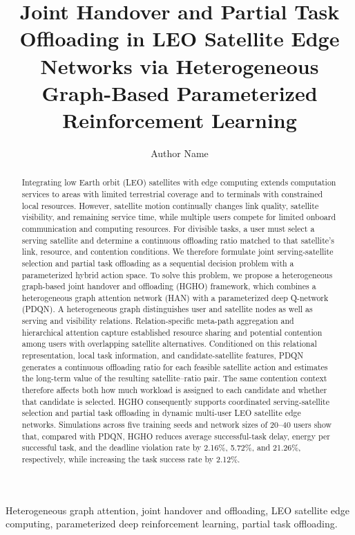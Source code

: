 \documentclass[journal]{IEEEtran}
\title{Joint Handover and Partial Task Offloading in LEO Satellite Edge Networks via Heterogeneous Graph-Based Parameterized Reinforcement Learning}
\author{Author Name}
\begin{document}
\maketitle

\begin{abstract}
Integrating low Earth orbit (LEO) satellites with edge computing extends computation services to areas with limited terrestrial coverage and to terminals with constrained local resources. However, satellite motion continually changes link quality, satellite visibility, and remaining service time, while multiple users compete for limited onboard communication and computing resources. For divisible tasks, a user must select a serving satellite and determine a continuous offloading ratio matched to that satellite's link, resource, and contention conditions. We therefore formulate joint serving-satellite selection and partial task offloading as a sequential decision problem with a parameterized hybrid action space. To solve this problem, we propose a heterogeneous graph-based joint handover and offloading (HGHO) framework, which combines a heterogeneous graph attention network (HAN) with a parameterized deep Q-network (PDQN). A heterogeneous graph distinguishes user and satellite nodes as well as serving and visibility relations. Relation-specific meta-path aggregation and hierarchical attention capture established resource sharing and potential contention among users with overlapping satellite alternatives. Conditioned on this relational representation, local task information, and candidate-satellite features, PDQN generates a continuous offloading ratio for each feasible satellite action and estimates the long-term value of the resulting satellite--ratio pair. The same contention context therefore affects both how much workload is assigned to each candidate and whether that candidate is selected. HGHO consequently supports coordinated serving-satellite selection and partial task offloading in dynamic multi-user LEO satellite edge networks. Simulations across five training seeds and network sizes of 20--40 users show that, compared with PDQN, HGHO reduces average successful-task delay, energy per successful task, and the deadline violation rate by 2.16\%, 5.72\%, and 21.26\%, respectively, while increasing the task success rate by 2.12\%.
\end{abstract}

\begin{IEEEkeywords}
Heterogeneous graph attention, joint handover and offloading, LEO satellite edge computing, parameterized deep reinforcement learning, partial task offloading.
\end{IEEEkeywords}
\end{document}
